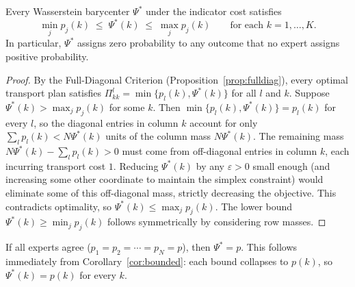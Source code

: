 \begin{corollary}[Boundedness]
\label{cor:bounded}
Every Wasserstein barycenter $\Psi^*$ under the indicator cost satisfies
\[
  \min_{j} p_j(k) \;\leq\; \Psi^*(k) \;\leq\; \max_{j} p_j(k)
  \qquad \text{for each } k = 1,\ldots,K.
\]
In particular, $\Psi^*$ assigns zero probability to any outcome that no expert assigns positive probability.
\end{corollary}
\begin{proof}
By the Full-Diagonal Criterion (Proposition~\ref{prop:fulldiag}), every optimal transport plan satisfies $\Pi^l_{kk} = \min\{p_l(k), \Psi^*(k)\}$ for all $l$ and $k$.  Suppose $\Psi^*(k) > \max_j p_j(k)$ for some $k$.  Then $\min\{p_l(k), \Psi^*(k)\} = p_l(k)$ for every $l$, so the diagonal entries in column $k$ account for only $\sum_l p_l(k) < N\Psi^*(k)$ units of the column mass $N\Psi^*(k)$.  The remaining mass $N\Psi^*(k) - \sum_l p_l(k) > 0$ must come from off-diagonal entries in column $k$, each incurring transport cost $1$.  Reducing $\Psi^*(k)$ by any $\varepsilon > 0$ small enough (and increasing some other coordinate to maintain the simplex constraint) would eliminate some of this off-diagonal mass, strictly decreasing the objective.  This contradicts optimality, so $\Psi^*(k) \leq \max_j p_j(k)$.  The lower bound $\Psi^*(k) \geq \min_j p_j(k)$ follows symmetrically by considering row masses.
\end{proof}

\begin{remark}[Unanimity]
If all experts agree ($p_1 = p_2 = \cdots = p_N = p$), then $\Psi^* = p$.  This follows immediately from Corollary~\ref{cor:bounded}: each bound collapses to $p(k)$, so $\Psi^*(k) = p(k)$ for every $k$.
\end{remark}

